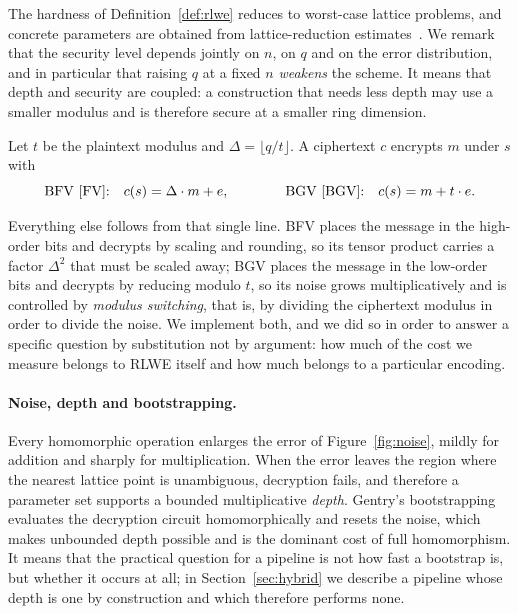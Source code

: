\documentclass[11pt]{article}
\begin{document}
The hardness of Definition~\ref{def:rlwe} reduces to worst-case lattice problems, and
concrete parameters are obtained from lattice-reduction estimates~\cite{HEStandard,ABDucas}.
We remark that the security level depends jointly on $n$, on $q$ and on the error
distribution, and in particular that raising $q$ at a fixed $n$ \emph{weakens} the scheme. It
means that depth and security are coupled: a construction that needs less depth may use a
smaller modulus and is therefore secure at a smaller ring dimension.

\begin{definition}
\label{def:bfvbgv}
Let $t$ be the plaintext modulus and $\Delta = \lfloor q/t \rfloor$. A ciphertext $c$
encrypts $m$ under $s$ with
\[
  \text{BFV~\cite{FV}:}\quad c(s) = \Delta\cdot m + e,
  \qquad\qquad
  \text{BGV~\cite{BGV}:}\quad c(s) = m + t\cdot e .
\]
\end{definition}

Everything else follows from that single line. BFV places the message in the high-order bits
and decrypts by scaling and rounding, so its tensor product carries a factor $\Delta^2$ that
must be scaled away; BGV places the message in the low-order bits and decrypts by reducing
modulo $t$, so its noise grows multiplicatively and is controlled by \emph{modulus
switching}, that is, by dividing the ciphertext modulus in order to divide the noise. We
implement both, and we did so in order to answer a specific question by substitution not by argument: how much of the cost we measure belongs to RLWE itself and how much belongs
to a particular encoding.

\paragraph{Noise, depth and bootstrapping.} Every homomorphic operation enlarges the error of
Figure~\ref{fig:noise}, mildly for addition and sharply for multiplication. When the error
leaves the region where the nearest lattice point is unambiguous, decryption fails, and
therefore a parameter set supports a bounded multiplicative \emph{depth}. Gentry's
bootstrapping~\cite{Gentry} evaluates the decryption circuit homomorphically and resets the
noise, which makes unbounded depth possible and is the dominant cost of full homomorphism. It
means that the practical question for a pipeline is not how fast a bootstrap is, but whether
it occurs at all; in Section~\ref{sec:hybrid} we describe a pipeline whose depth is one by
construction and which therefore performs none.
\end{document}
